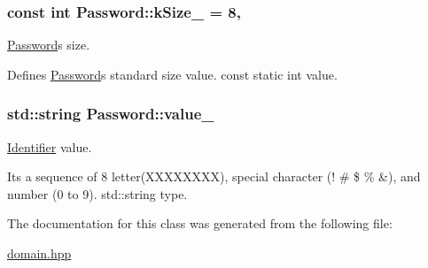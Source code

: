 \subsubsection[{\texorpdfstring{k\+Size\+\_\+}{kSize_}}]{\setlength{\rightskip}{0pt plus 5cm}const int Password\+::k\+Size\+\_\+ = 8\hspace{0.3cm}{\ttfamily [static]}, {\ttfamily [private]}}\hypertarget{classPassword_a83c0028de6ff048ad3d976faec956098}{}\label{classPassword_a83c0028de6ff048ad3d976faec956098}


\hyperlink{classPassword}{Password}\textquotesingle{}s size. 

Defines \hyperlink{classPassword}{Password}\textquotesingle{}s standard size value. const static int value. 
\subsubsection[{\texorpdfstring{value\+\_\+}{value_}}]{\setlength{\rightskip}{0pt plus 5cm}std\+::string Password\+::value\+\_\+\hspace{0.3cm}{\ttfamily [private]}}\hypertarget{classPassword_ae741ff7d079c6fcafd1fb1552684fe33}{}\label{classPassword_ae741ff7d079c6fcafd1fb1552684fe33}


\hyperlink{classIdentifier}{Identifier} value. 

It\textquotesingle{}s a sequence of 8 letter(\+X\+X\+X\+X\+X\+X\+X\+X), special character (! \# \$ \% \&), and number (0 to 9). std\+::string type. 

The documentation for this class was generated from the following file\+:\begin{DoxyCompactItemize}
\item 
\hyperlink{domain_8hpp}{domain.\+hpp}\end{DoxyCompactItemize}
